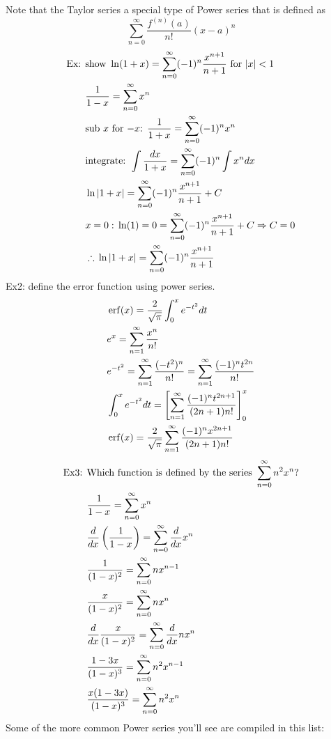 \documentclass[11pt, fleqn]{article}
\begin{document}
Note that the Taylor series a special type of Power series that is defined as
$$\sum_{n=0}^\infty\frac{f^{(n)}(a)}{n!}(x-a)^n$$
\begin{align*}
    \text{Ex: }&\text{show }\ln(1+x)=\sum_{n=0}^\infty(-1)^n\frac{x^{n+1}}{n+1}\text{ for }|x|<1\\
    &\frac{1}{1-x}=\sum_{n=0}^\infty x^n\\
    &\text{sub $x$ for $-x$: }\frac{1}{1+x}=\sum_{n=0}^\infty(-1)^nx^n\\
    &\text{integrate: }\int\frac{dx}{1+x}=\sum_{n=0}^\infty(-1)^n\int x^ndx\\
    &\ln|1+x|=\sum_{n=0}^\infty(-1)^n\frac{x^{n+1}}{n+1}+C\\
    &x=0:\,\ln(1)=0=\sum_{n=0}^\infty(-1)^n\frac{x^{n+1}}{n+1}+C\Rightarrow C=0\\
    &\therefore\,\ln|1+x|=\sum_{n=0}^\infty(-1)^n\frac{x^{n+1}}{n+1}
\end{align*}
Ex2: define the error function using power series.
\begin{align*}
    &\operatorname{erf}(x)=\frac{2}{\sqrt{\pi}}\int_0^xe^{-t^2}dt\\
    &e^x=\sum_{n=1}^\infty\frac{x^n}{n!}\\
    &e^{-t^2}=\sum_{n=1}^\infty\frac{(-t^2)^{n}}{n!}=\sum_{n=1}^\infty\frac{(-1)^nt^{2n}}{n!}\\
    &\int_0^x e^{-t^2}dt=\left[ \sum_{n=1}^\infty\frac{(-1)^nt^{2n+1}}{(2n+1)n!} \right]_0^x\\
    &\operatorname{erf}(x)=\frac{2}{\sqrt{\pi}}\sum_{n=1}^\infty\frac{(-1)^nx^{2n+1}}{(2n+1)n!}
\end{align*}
\begin{align*}
    \text{Ex3: }&\text{Which function is defined by the series }\sum_{n=0}^\infty n^2x^n\text{?}\\
    &\frac{1}{1-x}=\sum_{n=0}^\infty x^n\\
    &\frac{d}{dx}\left( \frac{1}{1-x} \right)=\sum_{n=0}^\infty\frac{d}{dx}x^n\\
    &\frac{1}{(1-x)^2}=\sum_{n=0}^\infty nx^{n-1}\\
    &\frac{x}{(1-x)^2}=\sum_{n=0}^\infty nx^n\\
    &\frac{d}{dx}\frac{x}{(1-x)^2}=\sum_{n=0}^\infty\frac{d}{dx} nx^n\\
    &\frac{1-3x}{(1-x)^3}=\sum_{n=0}^\infty n^2x^{n-1}\\
    &\frac{x(1-3x)}{(1-x)^3}=\sum_{n=0}^\infty n^2x^n\\
\end{align*}
Some of the more common Power series you'll see are compiled in this list:
\end{document}
